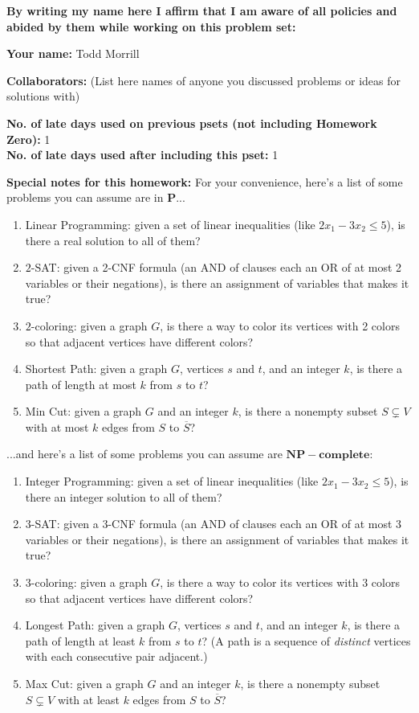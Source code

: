\documentclass[11pt]{article}
\begin{document}
	\textbf{By writing my name here I affirm that I am aware of all policies
		and abided by them while working on this problem set:}
	
	\textbf{Your name:} Todd Morrill
	
	\textbf{Collaborators:} (List here names of anyone you discussed
	problems or ideas for solutions with)
	
	\textbf{No. of late days used on previous psets (not including Homework Zero): } 1\\
	\textbf{No. of late days used after including this pset: } 1
	
	
	\newpage
	

\textbf{Special notes for this homework:}
For your convenience, here's a list of some problems you can assume are in $\mathbf{P}$...
\begin{enumerate}
	\item Linear Programming: given a set of linear inequalities (like $2x_1 - 3x_2 \le 5$), is there a real solution to all of them?
	\item $2$-SAT: given a 2-CNF formula (an AND of clauses each an OR of at most 2 variables or their negations), is there an assignment of variables that makes it true?
	\item $2$-coloring: given a graph $G$, is there a way to color its vertices with 2 colors so that adjacent vertices have different colors?
	\item Shortest Path: given a graph $G$, vertices $s$ and $t$, and an integer $k$, is there a path of length at most $k$ from $s$ to $t$?
	\item Min Cut: given a graph $G$ and an integer $k$, is there a nonempty subset $S \subsetneq V$ with at most $k$ edges from $S$ to $\overline{S}$? 
\end{enumerate}
...and here's a list of some problems you can assume are $\mathbf{NP-complete}$:
\begin{enumerate}
	\item Integer Programming: given a set of linear inequalities (like $2x_1 - 3x_2 \le 5$), is there an integer solution to all of them?
	\item $3$-SAT: given a 3-CNF formula (an AND of clauses each an OR of at most 3 variables or their negations), is there an assignment of variables that makes it true?
	\item $3$-coloring: given a graph $G$, is there a way to color its vertices with 3 colors so that adjacent vertices have different colors?
	\item Longest Path: given a graph $G$, vertices $s$ and $t$, and an integer $k$, is there a path of length at least $k$ from $s$ to $t$? (A path is a sequence of \emph{distinct} vertices with each consecutive pair adjacent.)
	\item Max Cut: given a graph $G$ and an integer $k$, is there a nonempty subset $S \subsetneq V$ with at least $k$ edges from $S$ to $\overline{S}$? 
\end{enumerate}
\end{document}
